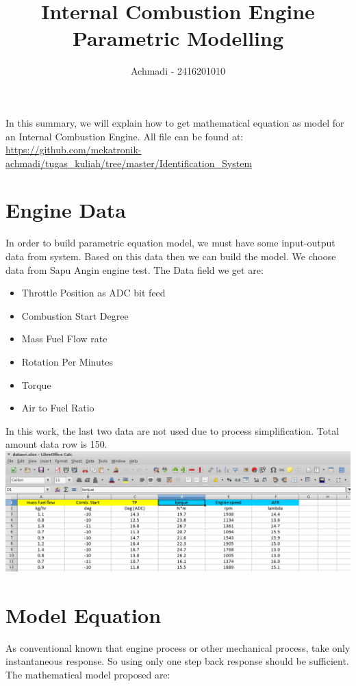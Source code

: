 \documentclass{article}
\begin{document}
\title{Internal Combustion Engine Parametric Modelling}
\author{Achmadi - 2416201010}
\date{\vspace{-5ex}}

\maketitle


In this summary, we will explain how to get mathematical equation as model for an Internal Combustion Engine.
All file can be found at:\\
\url{https://github.com/mekatronik-achmadi/tugas_kuliah/tree/master/Identification_System}

\section{Engine Data}

In order to build parametric equation model, we must have some input-output data from system.
Based on this data then we can build the model.
We choose data from Sapu Angin engine test.
The Data field we get are:
\begin{itemize}
	\item Throttle Position as ADC bit feed
	\item Combustion Start Degree
	\item Mass Fuel Flow rate
	\item Rotation Per Minutes
	\item Torque
	\item Air to Fuel Ratio
\end{itemize} 

In this work, the last two data are not used due to process simplification.
Total amount data row is 150.\\
\includegraphics[width=500pt]{data}\\

\section{Model Equation}
As conventional known that engine process or other mechanical process, take only instantaneous response.
So using only one step back response should be sufficient.
The mathematical model proposed are:\\
\end{document}
